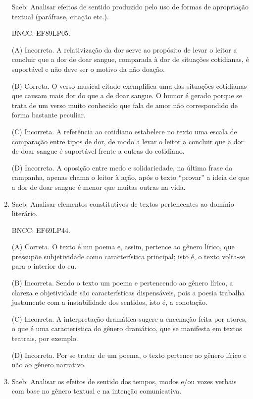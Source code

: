 \begin{enumerate}
Saeb: Analisar efeitos de sentido produzido pelo uso de formas de
apropriação textual (paráfrase, citação etc.).

BNCC: EF89LP05.

(A) Incorreta. A relativização da dor serve ao propósito de levar o
leitor a concluir que a dor de doar sangue, comparada à dor de situações
cotidianas, é suportável e não deve ser o motivo da não doação.

(B) Correta. O verso musical citado exemplifica uma das situações
cotidianas que causam mais dor do que a de doar sangue. O humor é gerado
porque se trata de um verso muito conhecido que fala de amor não
correspondido de forma bastante peculiar.

(C) Incorreta. A referência ao cotidiano estabelece no texto uma escala
de comparação entre tipos de dor, de modo a levar o leitor a concluir
que a dor de doar sangue é suportável frente a outras do cotidiano.

(D) Incorreta. A oposição entre medo e solidariedade, na última frase da
campanha, apenas chama o leitor à ação, após o texto ``provar'' a ideia
de que a dor de doar sangue é menor que muitas outras na vida.

\item

Saeb: Analisar elementos constitutivos de textos pertencentes ao domínio
literário.

BNCC: EF69LP44.

(A) Correta. O texto é um poema e, assim, pertence ao gênero lírico, que
pressupõe subjetividade como característica principal; isto é, o texto
volta-se para o interior do eu.

(B) Incorreta. Sendo o texto um poema e pertencendo ao gênero lírico, a
clareza e objetividade são características dispensáveis, pois a poesia
trabalha justamente com a instabilidade dos sentidos, isto é, a
conotação.

(C) Incorreta. A interpretação dramática sugere a encenação feita por
atores, o que é uma característica do gênero dramático, que se manifesta
em textos teatrais, por exemplo.

(D) Incorreta. Por se tratar de um poema, o texto pertence ao gênero
lírico e não ao gênero narrativo.


\item

Saeb: Analisar os efeitos de sentido dos tempos, modos e/ou vozes
verbais com base no gênero textual e na intenção comunicativa.


\end{enumerate}
